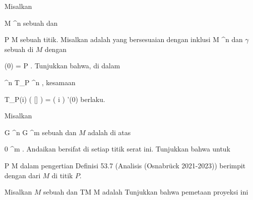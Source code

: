 {}
{

Misalkan

\mavergleichskette
{\vergleichskette
{ M
}
{ \subseteq }{ \R^n
}
{  }{
}
{    }{
}
{   }{
}
}
{}{}{}
sebuah
dan

\mavergleichskette
{\vergleichskette
{ P
}
{ \in }{ M
}
{  }{
}
{    }{
}
{   }{
}
}
{}{}{}
sebuah titik. Misalkan
 adalah
yang bersesuaian dengan inklusi
 { M } {\R^n
} {}
dan $\gamma$ sebuah
di $M$ dengan

\mavergleichskettedisp
{\vergleichskette
{ \gamma(0)
}
{ =} { P
}
{ } {
}
{ } {
}
{ } {
}
}
{}{}{.}
Tunjukkan bahwa, di dalam

\mavergleichskette
{\vergleichskette
{ \R^n
}
{ \cong }{ T_P \R^n
}
{  }{
}
{    }{
}
{   }{
}
}
{}{}{}, kesamaan

\mavergleichskettedisp
{\vergleichskette
{ T_P(i) ( [\gamma] )
}
{ =} { \left(  i \circ \gamma  \right) '(0)
}
{ } {
}
{ } {
}
{ } {
}
}
{}{}{}
berlaku.

}
{} {}

{}
{

Misalkan

\mavergleichskette
{\vergleichskette
{ G
}
{ \subseteq }{ \R^n
}
{  }{
}
{    }{
}
{   }{
}
}
{}{}{}
\maabb {\varphi} { G } {\R^m
} {}
sebuah
dan $M$ adalah
di atas

\mavergleichskette
{\vergleichskette
{ 0
}
{ \in }{ \R^m
}
{  }{
}
{    }{
}
{   }{
}
}
{}{}{.}
Andaikan
bersifat
di setiap titik serat ini. Tunjukkan bahwa untuk

\mavergleichskette
{\vergleichskette
{ P
}
{ \in }{ M
}
{  }{
}
{    }{
}
{   }{
}
}
{}{}{}
dalam pengertian
Definisi 53.7 (Analisis (Osnabrück 2021-2023)) berimpit dengan
dari
$M$ di titik $P$.

}
{} {}

{}
{

Misalkan $M$ sebuah
dan
\maabbdisp {\pi} {TM} {M
} {}
adalah
Tunjukkan bahwa pemetaan proyeksi ini

}
{} {}

